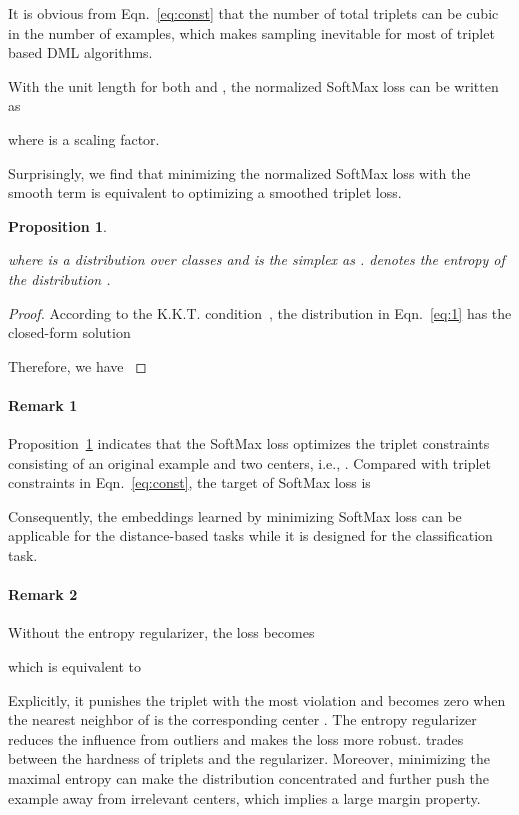 \documentclass[10pt,twocolumn,letterpaper]{article}
\newtheorem{prop}{Proposition}
\begin{document}
It is obvious from Eqn.~\ref{eq:const} that the number of total triplets can be cubic in the number of examples, which makes sampling inevitable for most of triplet based DML algorithms. 

With the unit length for both  and , the normalized SoftMax loss can be written as 

where  is a scaling factor.

Surprisingly, we find that minimizing the normalized SoftMax loss with the smooth term  is equivalent to optimizing a smoothed triplet loss.
\begin{prop}\label{prop:1}

where  is a distribution over classes and  is the simplex as .  denotes the entropy of the distribution .
\end{prop}
\begin{proof}

According to the K.K.T. condition~\cite{boyd2004convex}, the distribution  in Eqn.~\ref{eq:1} has the closed-form solution

Therefore, we have
\small{
}
\end{proof}
\paragraph{Remark 1} Proposition~\ref{prop:1} indicates that the SoftMax loss optimizes the triplet constraints consisting of an original example and two centers, i.e., . Compared with triplet constraints in Eqn.~\ref{eq:const}, the target of SoftMax loss is

Consequently, the embeddings learned by minimizing SoftMax loss can be applicable for the distance-based tasks while it is designed for the classification task.
\paragraph{Remark 2} Without the entropy regularizer, the loss becomes

which is equivalent to

Explicitly, it punishes the triplet with the most violation and becomes zero when the nearest neighbor of  is the corresponding center . The entropy regularizer reduces the influence from outliers and makes the loss more robust.  trades between the hardness of triplets and the regularizer. Moreover, minimizing the maximal entropy can make the distribution concentrated and further push the example away from irrelevant centers, which implies a large margin property.
\end{document}
